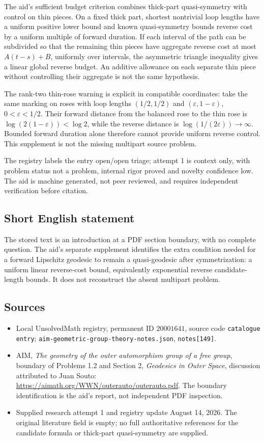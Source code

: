 \documentclass[11pt]{article}
\begin{document}
The aid's sufficient budget criterion combines thick-part quasi-symmetry with control on thin pieces. On a fixed thick part, shortest nontrivial loop lengths have a uniform positive lower bound and known quasi-symmetry bounds reverse cost by a uniform multiple of forward duration. If each interval of the path can be subdivided so that the remaining thin pieces have aggregate reverse cost at most \(A(t-s)+B\), uniformly over intervals, the asymmetric triangle inequality gives a linear global reverse budget. An additive allowance on each separate thin piece without controlling their aggregate is not the same hypothesis.

The rank-two thin-rose warning is explicit in compatible coordinates: take the same marking on roses with loop lengths \((1/2,1/2)\) and \((\varepsilon,1-\varepsilon)\), \(0<\varepsilon<1/2\). Their forward distance from the balanced rose to the thin rose is \(\log(2(1-\varepsilon))<\log2\), while the reverse distance is \(\log(1/(2\varepsilon))\to\infty\). Bounded forward duration alone therefore cannot provide uniform reverse control. This supplement is not the missing multipart source problem.

The registry labels the entry open/open triage; attempt 1 is context only, with problem status not a problem, internal rigor proved and novelty confidence low. The aid is machine generated, not peer reviewed, and requires independent verification before citation.
\subsection{Short English statement}
The stored text is an introduction at a PDF section boundary, with no complete question. The aid's separate supplement identifies the extra condition needed for a forward Lipschitz geodesic to remain a quasi-geodesic after symmetrization: a uniform linear reverse-cost bound, equivalently exponential reverse candidate-length bounds. It does not reconstruct the absent multipart problem.
\subsection{Sources}
\begin{itemize}
\item Local UnsolvedMath registry, permanent ID \(20001641\), source code \texttt{catalogue entry}; \texttt{aim-geometric-group-theory-notes.json}, \texttt{notes[149]}.
\item AIM, \emph{The geometry of the outer automorphism group of a free group}, boundary of Problems 1.2 and Section 2, \emph{Geodesics in Outer Space}, discussion attributed to Juan Souto: \url{https://aimath.org/WWN/outerauto/outerauto.pdf}. The boundary identification is the aid's report, not independent PDF inspection.
\item Supplied research attempt 1 and registry update August 14, 2026. The original literature field is empty; no full authoritative references for the candidate formula or thick-part quasi-symmetry are supplied.
\end{itemize}
\end{document}
